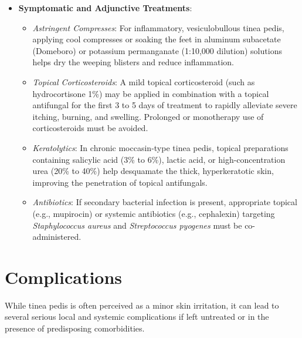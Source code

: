 \begin{itemize}
\begin{itemize}
        \item \textit{Itraconazole}: Prescribed at 100 to 200 mg daily for 2 to 4 weeks, or as pulse therapy (200 mg twice daily for 1 week, followed by 3 weeks off, for 1-2 cycles). It is metabolized by the CYP3A4 system, necessitating a careful review of potential drug-drug interactions (e.g., with statins, oral anticoagulants, or antiarrhythmics).
        \item \textit{Fluconazole}: Prescribed off-label at 150 mg once weekly for 4 to 6 weeks. It is a useful alternative for patients who cannot tolerate terbinafine or itraconazole.
    \end{itemize}
    \item \textbf{Symptomatic and Adjunctive Treatments}:
    \begin{itemize}
        \item \textit{Astringent Compresses}: For inflammatory, vesiculobullous tinea pedis, applying cool compresses or soaking the feet in aluminum subacetate (Domeboro) or potassium permanganate (1:10,000 dilution) solutions helps dry the weeping blisters and reduce inflammation.
        \item \textit{Topical Corticosteroids}: A mild topical corticosteroid (such as hydrocortisone 1\%) may be applied in combination with a topical antifungal for the first 3 to 5 days of treatment to rapidly alleviate severe itching, burning, and swelling. Prolonged or monotherapy use of corticosteroids must be avoided.
        \item \textit{Keratolytics}: In chronic moccasin-type tinea pedis, topical preparations containing salicylic acid (3\% to 6\%), lactic acid, or high-concentration urea (20\% to 40\%) help desquamate the thick, hyperkeratotic skin, improving the penetration of topical antifungals.
        \item \textit{Antibiotics}: If secondary bacterial infection is present, appropriate topical (e.g., mupirocin) or systemic antibiotics (e.g., cephalexin) targeting \textit{Staphylococcus aureus} and \textit{Streptococcus pyogenes} must be co-administered.
    \end{itemize}
\end{itemize}

\section*{Complications}
While tinea pedis is often perceived as a minor skin irritation, it can lead to several serious local and systemic complications if left untreated or in the presence of predisposing comorbidities.

